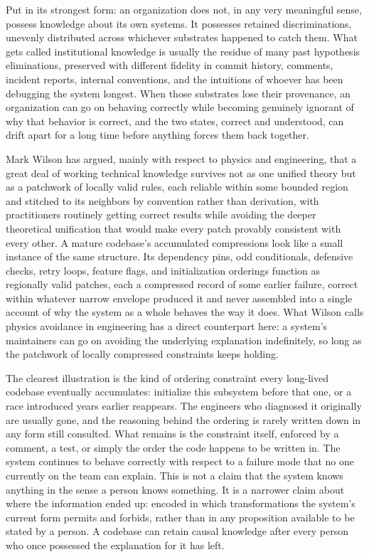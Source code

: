 \documentclass[11pt]{article}
\begin{document}
Put in its strongest form: an organization does not, in any very meaningful sense, possess knowledge about its own systems. It possesses retained discriminations, unevenly distributed across whichever substrates happened to catch them. What gets called institutional knowledge is usually the residue of many past hypothesis eliminations, preserved with different fidelity in commit history, comments, incident reports, internal conventions, and the intuitions of whoever has been debugging the system longest. When those substrates lose their provenance, an organization can go on behaving correctly while becoming genuinely ignorant of why that behavior is correct, and the two states, correct and understood, can drift apart for a long time before anything forces them back together.

Mark Wilson has argued, mainly with respect to physics and engineering, that a great deal of working technical knowledge survives not as one unified theory but as a patchwork of locally valid rules, each reliable within some bounded region and stitched to its neighbors by convention rather than derivation, with practitioners routinely getting correct results while avoiding the deeper theoretical unification that would make every patch provably consistent with every other. A mature codebase's accumulated compressions look like a small instance of the same structure. Its dependency pins, odd conditionals, defensive checks, retry loops, feature flags, and initialization orderings function as regionally valid patches, each a compressed record of some earlier failure, correct within whatever narrow envelope produced it and never assembled into a single account of why the system as a whole behaves the way it does. What Wilson calls physics avoidance in engineering has a direct counterpart here: a system's maintainers can go on avoiding the underlying explanation indefinitely, so long as the patchwork of locally compressed constraints keeps holding.

The clearest illustration is the kind of ordering constraint every long-lived codebase eventually accumulates: initialize this subsystem before that one, or a race introduced years earlier reappears. The engineers who diagnosed it originally are usually gone, and the reasoning behind the ordering is rarely written down in any form still consulted. What remains is the constraint itself, enforced by a comment, a test, or simply the order the code happens to be written in. The system continues to behave correctly with respect to a failure mode that no one currently on the team can explain. This is not a claim that the system knows anything in the sense a person knows something. It is a narrower claim about where the information ended up: encoded in which transformations the system's current form permits and forbids, rather than in any proposition available to be stated by a person. A codebase can retain causal knowledge after every person who once possessed the explanation for it has left.
\end{document}

